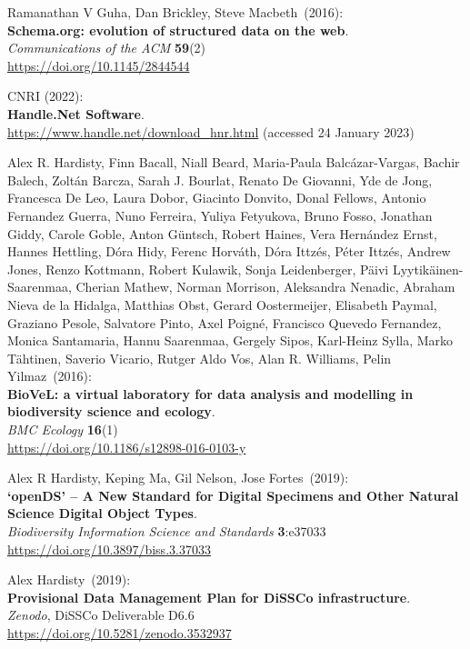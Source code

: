 \begin{thebibliography}{9}
Ramanathan V Guha, Dan Brickley, Steve Macbeth~(2016):\\
\textbf{Schema.org: evolution of structured data on the web}.\\
\emph{Communications of the ACM} \textbf{59}(2)\\
\url{https://doi.org/10.1145/2844544}

CNRI (2022): \\
\textbf{Handle.Net Software}. \\
\url{https://www.handle.net/download_hnr.html} (accessed 24 January
2023)

Alex R. Hardisty, Finn Bacall, Niall Beard, Maria-Paula Balcázar-Vargas, Bachir Balech, Zoltán Barcza, Sarah J. Bourlat, Renato De Giovanni, Yde de Jong, Francesca De Leo, Laura Dobor, Giacinto Donvito, Donal Fellows, Antonio Fernandez Guerra, Nuno Ferreira, Yuliya Fetyukova, Bruno Fosso, Jonathan Giddy, Carole Goble, Anton Güntsch, Robert Haines, Vera Hernández Ernst, Hannes Hettling, Dóra Hidy, Ferenc Horváth, Dóra Ittzés, Péter Ittzés, Andrew Jones, Renzo Kottmann, Robert Kulawik, Sonja Leidenberger, Päivi Lyytikäinen-Saarenmaa, Cherian Mathew, Norman Morrison, Aleksandra Nenadic, Abraham Nieva de la Hidalga, Matthias Obst, Gerard Oostermeijer, Elisabeth Paymal, Graziano Pesole, Salvatore Pinto, Axel Poigné, Francisco Quevedo Fernandez, Monica Santamaria, Hannu Saarenmaa, Gergely Sipos, Karl-Heinz Sylla, Marko Tähtinen, Saverio Vicario, Rutger Aldo Vos, Alan R. Williams, Pelin Yilmaz~(2016):\\
\textbf{BioVeL: a virtual laboratory for data analysis and modelling in biodiversity science and ecology}.\\
\emph{BMC Ecology} \textbf{16}(1)\\
\url{https://doi.org/10.1186/s12898-016-0103-y}

Alex R Hardisty, Keping Ma, Gil Nelson, Jose Fortes~(2019):\\
\textbf{`openDS' -- A New Standard for Digital Specimens and Other
Natural Science Digital Object Types}.\\
\emph{Biodiversity Information Science and Standards}
\textbf{3}:e37033\\
\url{https://doi.org/10.3897/biss.3.37033}

Alex Hardisty~(2019):\\
\textbf{Provisional Data Management Plan for DiSSCo infrastructure}.\\ 
\emph{Zenodo}, DiSSCo Deliverable D6.6\\
\url{https://doi.org/10.5281/zenodo.3532937}


\end{thebibliography}

